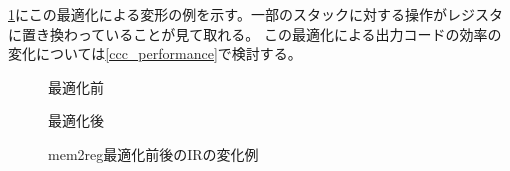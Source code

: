 \documentclass[../main.tex]{subfiles}
\begin{document}
\cref{ccc_mem2reg_fig}にこの最適化による変形の例を示す。一部のスタックに対する操作がレジスタに置き換わっていることが見て取れる。
この最適化による出力コードの効率の変化については\cref{ccc_performance}で検討する。

\begin{figure}[h]
  \begin{minipage}{0.50\hsize}
    \centering
    
    \caption*{最適化前}
  \end{minipage}
  \begin{minipage}{0.50\hsize}
    \centering
    
    \caption*{最適化後}
  \end{minipage}
  \caption{mem2reg最適化前後のIRの変化例}
  \label{ccc_mem2reg_fig}
\end{figure}
\end{document}
